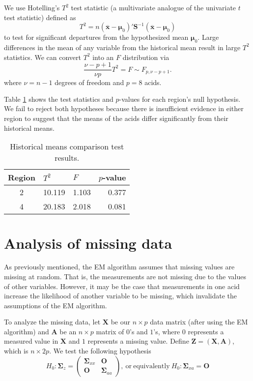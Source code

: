 \documentclass[11pt]{article}
\newcommand{\m}[1]{\mathbf{\bm{#1}}}
\begin{document}
We use Hotelling's $T^2$ test statistic (a multivariate analogue of the univariate $t$ test statistic) defined as
\[ T^2 = n(\overline{\m{x}}-\m{\mu}_0)'\m{S}^{-1}(\overline{\m{x}}-\m{\mu}_0) \]
to test for significant departures from the hypothesized mean $\m{\mu}_0$. Large differences in the mean of any variable from the historical mean result in large $T^2$ statistics. We can convert $T^2$ into an $F$ distribution via
\[ \frac{\nu -p+1}{\nu p}T^2 = F \sim F_{p,\nu-p+1}. \]
where $\nu=n-1$ degrees of freedom and $p=8$ acids.

Table \ref{history} shows the test statistics and $p$-values for each region's null hypothesis. We fail to reject both hypotheses because there is insufficient evidence in either region to suggest that the means of the acids differ significantly from their historical means.

\begin{table}[ht]
\begin{center}
\begin{tabular}{c | rrr}
Region & \multicolumn{1}{l}{$T^2$}  & \multicolumn{1}{l}{$F$}    & \multicolumn{1}{l}{$p$-value} \\ \hline \hline
     2 & 10.119 & 1.103  & 0.377     \\
     4 & 20.183 & 2.018  & 0.081     \\
\end{tabular}
\caption{Historical means comparison test results.}
\label{history}
\end{center}
\end{table}
\vspace{-10mm}

\section*{Analysis of missing data}
\vspace{-4mm}
As previously mentioned, the EM algorithm assumes that missing values are missing at random. That is, the measurements are not missing due to the values of other variables. However, it may be the case that measurements in one acid increase the likelihood of another variable to be missing, which invalidate the assumptions of the EM algorithm.

To analyze the missing data, let $\m{X}$ be our $n\times p$ data matrix (after using the EM algorithm) and $\m{A}$ be an $n\times p$ matrix of $0$'s and $1$'s, where $0$ represents a measured value in $\m{X}$ and $1$ represents a missing value. Define $\m{Z} = (\m{X}, \m{A})$, which is $n\times 2p$. We test the following hypothesis
\vspace{-3mm}
\[H_0:\m{\Sigma}_z = \left(\begin{array}{ll} \m{\Sigma}_{xx} & \m{O} \\ \m{O} & \m{\Sigma}_{aa} \end{array}\right),~\mathrm{or~equivalently}~H_0:\m{\Sigma}_{xa}=\m{O}\]
\vspace{-6mm}
\end{document}
